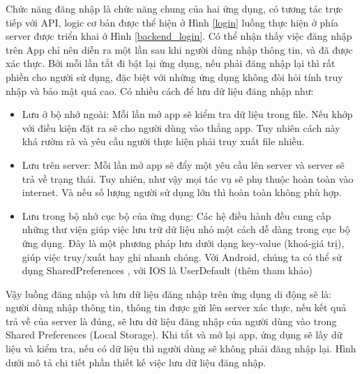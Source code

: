 Chức năng đăng nhập là chức năng chung của hai ứng dụng, có tương tác trực tiếp với API, logic cơ bản được thể hiện ở Hình \ref{login}
luồng thực hiện ở phía server được triển khai ở 
Hình \ref{backend_login}. Có thể nhận thấy việc đăng nhập trên App chỉ nên diễn ra một lần sau khi người dùng nhập thông tin,
và đã được xác thực. Bởi mỗi lần tắt đi bật lại ứng dụng, nếu phải đăng nhập lại thì rất phiền cho người sử dụng, đặc biệt
với những ứng dụng không đòi hỏi tính truy nhập và bảo mật quá cao. Có nhiều cách để lưu dữ liệu đăng nhập như:

\begin{itemize}
  \item Lưu ở bộ nhớ ngoài: Mỗi lần mở app sẽ kiểm tra dữ liệu trong file. Nếu khớp với điều kiện đặt ra sẽ cho người dùng vào thẳng app.
  Tuy nhiên cách này khá rườm rà và yêu cầu người thực hiện phải truy xuất file nhiều.
  \item Lưu trên server: Mỗi lần mở app sẽ đẩy một yêu cầu lên server và server sẽ trả về trạng thái. Tuy nhiên, như vậy mọi tác
  vụ sẽ phụ thuộc hoàn toàn vào internet. Và nếu số lượng người sử dụng lớn thì hoàn toàn không phù hợp.
  \item Lưu trong bộ nhớ cục bộ của ứng dụng: Các hệ điều hành đều cung cấp những thư viện giúp việc lưu trữ dữ liệu nhỏ một cách 
  dễ dàng trong cục bộ ứng dụng. Đây là một phương pháp lưu dưới dạng key-value (khoá-giá trị), giúp việc truy/xuất hay ghi nhanh chóng.
  Với Android, chúng ta có thể sử dụng SharedPreferences \cite{intro_sharedpref}, với IOS là UserDefault (thêm tham khảo)

\end{itemize}
Vậy luồng đăng nhập và lưu dữ liệu đăng nhập trên ứng dụng di động sẽ là: người dùng nhập thông tin, thông tin được gửi lên server xác thực,
nếu kết quả trả về của server là đúng, sẽ lưu dữ liệu đăng nhập của người dùng vào trong Shared Preferences (Local Storage). Khi tắt và mở lại app,
ứng dụng sẽ lấy dữ liệu và kiểm tra, nếu có dữ liệu thì người dùng sẽ không phải đăng nhập lại. Hình dưới mô tả chi tiết phần thiết
kế việc lưu dữ liệu đăng nhập.


